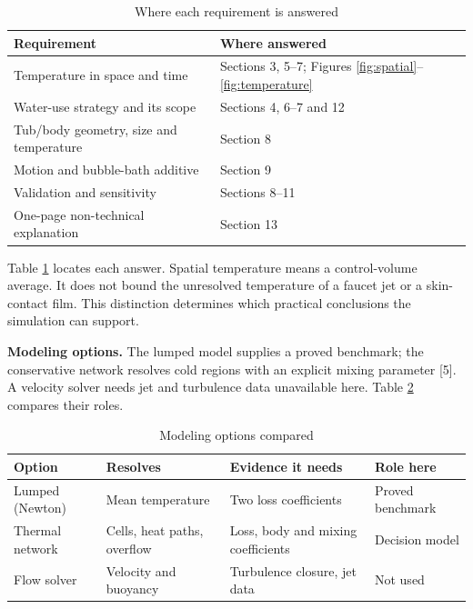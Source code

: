 \documentclass[12pt,a4paper]{article}
\begin{document}
\begin{table}[ht]\centering\normalsize\caption{Where each requirement is answered}\label{tab:1}
\begin{tabular}{@{}>{\raggedright\arraybackslash}p{0.4487\dimexpr\linewidth-2\tabcolsep\relax}>{\raggedright\arraybackslash}p{0.5513\dimexpr\linewidth-2\tabcolsep\relax}@{}}
\toprule
Requirement & Where answered \\ \midrule
Temperature in space and time & Sections 3, 5–7; Figures \ref{fig:spatial}–\ref{fig:temperature} \\
Water-use strategy and its scope & Sections 4, 6–7 and 12 \\
Tub/body geometry, size and temperature & Section 8 \\
Motion and bubble-bath additive & Section 9 \\
Validation and sensitivity & Sections 8–11 \\
One-page non-technical explanation & Section 13 \\ \bottomrule
\end{tabular}
\end{table}
Table \ref{tab:1} locates each answer. Spatial temperature means a control-volume average. It does not bound the unresolved temperature of a faucet jet or a skin-contact film. This distinction determines which practical conclusions the simulation can support.

\textbf{Modeling options.} The lumped model supplies a proved benchmark; the conservative network resolves cold regions with an explicit mixing parameter [5]. A velocity solver needs jet and turbulence data unavailable here. Table \ref{tab:2} compares their roles.

\begin{table}[ht]\centering\normalsize\caption{Modeling options compared}\label{tab:2}
\begin{tabular}{@{}>{\raggedright\arraybackslash}p{0.2137\dimexpr\linewidth-6\tabcolsep\relax}>{\raggedright\arraybackslash}p{0.2564\dimexpr\linewidth-6\tabcolsep\relax}>{\raggedright\arraybackslash}p{0.2778\dimexpr\linewidth-6\tabcolsep\relax}>{\raggedright\arraybackslash}p{0.2521\dimexpr\linewidth-6\tabcolsep\relax}@{}}
\toprule
Option & Resolves & Evidence it needs & Role here \\ \midrule
Lumped (Newton) & Mean temperature & Two loss coefficients & Proved benchmark \\
Thermal network & Cells, heat paths, overflow & Loss, body and mixing coefficients & Decision model \\
Flow solver & Velocity and buoyancy & Turbulence closure, jet data & Not used \\ \bottomrule
\end{tabular}
\end{table}
\end{document}
